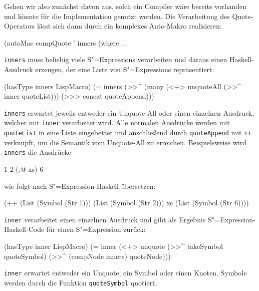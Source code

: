 \documentclass[12pt, a4paper, bibgerm]{scrbook}
\newenvironment{DIFnomarkup}{}{}
\newcommand\icode[1]{\lstinline?#1?}
\newcommand{\sexp}{S"=Expression}
\newcommand{\sexps}{S"=Expressions}
\begin{document}
Gehen wir also zunächst davon aus, solch ein Compiler wäre bereits
vorhanden und könnte für die Implementation genutzt werden. Die
Verarbeitung des Quote-Operators lässt sich dann durch ein komplexes
Auto-Makro realisieren:
\begin{DIFnomarkup}\begin{code}
(autoMac compQuote ' inners
  (where
    ...
\end{code}\end{DIFnomarkup}
\icode{inners} muss beliebig viele \sexps{} verarbeiten und daraus einen
Haskell-Ausdruck erzeugen, der eine Liste von \sexps{}
repräsentiert:
\begin{DIFnomarkup}\begin{code}
    (hasType inners LispMacro)
    (= inners
       (>>^ (many (<+> unquoteAll 
                       (>>^ inner quoteList)))
            (>>> concat quoteAppend)))
\end{code}\end{DIFnomarkup}
\icode{inners} erwartet jeweils entweder ein Unquote-All oder einen
einzelnen Ausdruck, welcher mit \icode{inner} verarbeitet wird. Alle
normalen Ausdrücke werden mit \icode{quoteList} in eine Liste
eingebettet und anschließend durch \icode{quoteAppend} mit \icode{++}
verknüpft, um die Semantik vom Unquote-All zu erreichen. Beispielsweise
wird \icode{inners} die Ausdrücke 
\begin{DIFnomarkup}\begin{code}
1 2 (,@ xs) 6  
\end{code}\end{DIFnomarkup}
wie folgt nach \sexp{}-Haskell übersetzen:
\begin{DIFnomarkup}\begin{code}
(++ (List (Symbol (Str 1)))
    (List (Symbol (Str 2)))
    xs    
    (List (Symbol (Str 6))))
\end{code}\end{DIFnomarkup}
\icode{inner} verarbeitet einen einzelnen Ausdruck und gibt als Ergebnis
\sexp{}-Haskell-Code für einen \sexp{} zurück:
\begin{DIFnomarkup}\begin{code}
    (hasType inner LispMacro)
    (= inner (<+> unquote    
                  (>>^ takeSymbol quoteSymbol)     
                  (>>^ (compNode inners) quoteNode)))
\end{code}\end{DIFnomarkup}
\icode{inner} erwartet entweder ein Unquote, ein Symbol oder einen
Knoten. Symbole werden durch die Funktion \icode{quoteSymbol} quotiert,
\end{document}
